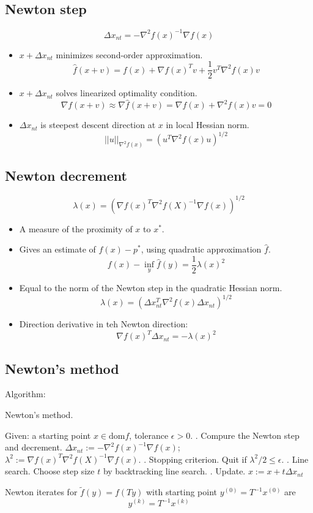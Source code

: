 \subsection{Newton step}
$$
\Delta x_{nt} = - \nabla^2 f(x)^{-1}\nabla f(x)
$$
\begin{itemize}
    \item $x + \Delta x_{nt}$ minimizes second-order approximation.
    $$
    \hat{f}(x + v) = f(x) + \nabla f(x)^Tv + \frac{1}{2}v^T \nabla^2 f(x)v
    $$
    \item $x + \Delta x_{nt}$ solves linearized optimality condition.
    $$
    \nabla f(x + v) \approx \nabla \hat{f}(x + v) = \nabla f(x) + \nabla^2 f(x)v = 0
    $$
    \item $\Delta x_{nt}$ is steepest descent direction at $x$ in local Hessian norm.
    $$
    ||u||_{\nabla^2 f(x)} = (u^T\nabla^2 f(x)u)^{1/2}
    $$
\end{itemize}

\subsection{Newton decrement}
$$
\lambda(x) = (\nabla f(x)^T \nabla^2 f(X)^{-1}\nabla f(x))^{1/2}
$$
\begin{itemize}
    \item A measure of the proximity of $x$ to $x^*$.
    \item Gives an estimate of $f(x) - p^*$, using quadratic approximation $\hat{f}$.
    $$
    f(x) - \inf_{y}\hat{f}(y) = \frac{1}{2}\lambda(x)^2
    $$
    \item Equal to the norm of the Newton step in the quadratic Hessian norm.
    $$
    \lambda(x) = (\Delta x^T_{nt}\nabla^2 f(x) \Delta x_{nt})^{1/2}
    $$
    \item Direction derivative in teh Newton direction:
    $$
    \nabla f(x)^T \Delta x_{nt} = -\lambda (x)^2
    $$
\end{itemize}

\subsection{Newton's method}
Algorithm:
\begin{algorithm}[H]
	\caption{Newton's method.}
	\begin{algorithmic}[1]
        \State Given: a starting point $x \in \text{dom} f$, tolerance $\epsilon > 0$.
        \MRepeat
            . Compure the Newton step and decrement.
            \State $\Delta x_{nt} := -\nabla^2 f(x)^{-1}\nabla f(x)$;  $\lambda^2 := \nabla f(x)^T \nabla^2 f(X)^{-1}\nabla f(x)$. 
            . Stopping criterion. Quit if $\lambda^2/2 \le \epsilon$.
            . Line search. Choose step size $t$ by backtracking line search.
            . Update. $x := x + t\Delta x_{nt}$
        \EndRepeat
	\end{algorithmic}
\end{algorithm}
Newton iterates for $\tilde{f}(y) = f(Ty)$ with starting point $y^{(0)} = T^{-1}x^{(0)}$ are
$$
y^{(k)} = T^{-1}x^{(k)}
$$

